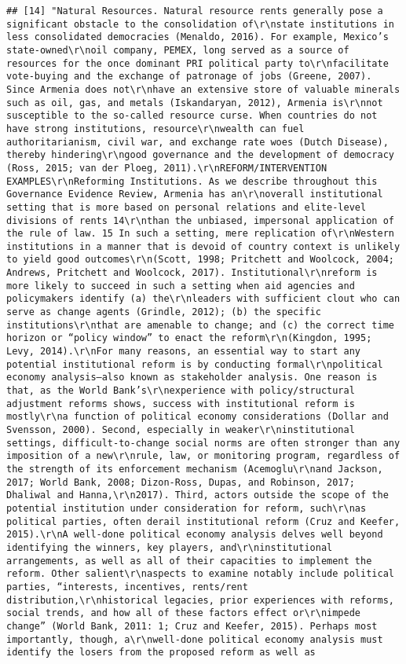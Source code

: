 \documentclass[
]{article}
\begin{document}
\begin{verbatim}
## [14] "Natural Resources. Natural resource rents generally pose a significant obstacle to the consolidation of\r\nstate institutions in less consolidated democracies (Menaldo, 2016). For example, Mexico’s state-owned\r\noil company, PEMEX, long served as a source of resources for the once dominant PRI political party to\r\nfacilitate vote-buying and the exchange of patronage of jobs (Greene, 2007). Since Armenia does not\r\nhave an extensive store of valuable minerals such as oil, gas, and metals (Iskandaryan, 2012), Armenia is\r\nnot susceptible to the so-called resource curse. When countries do not have strong institutions, resource\r\nwealth can fuel authoritarianism, civil war, and exchange rate woes (Dutch Disease), thereby hindering\r\ngood governance and the development of democracy (Ross, 2015; van der Ploeg, 2011).\r\nREFORM/INTERVENTION EXAMPLES\r\nReforming Institutions. As we describe throughout this Governance Evidence Review, Armenia has an\r\noverall institutional setting that is more based on personal relations and elite-level divisions of rents 14\r\nthan the unbiased, impersonal application of the rule of law. 15 In such a setting, mere replication of\r\nWestern institutions in a manner that is devoid of country context is unlikely to yield good outcomes\r\n(Scott, 1998; Pritchett and Woolcock, 2004; Andrews, Pritchett and Woolcock, 2017). Institutional\r\nreform is more likely to succeed in such a setting when aid agencies and policymakers identify (a) the\r\nleaders with sufficient clout who can serve as change agents (Grindle, 2012); (b) the specific institutions\r\nthat are amenable to change; and (c) the correct time horizon or “policy window” to enact the reform\r\n(Kingdon, 1995; Levy, 2014).\r\nFor many reasons, an essential way to start any potential institutional reform is by conducting formal\r\npolitical economy analysis—also known as stakeholder analysis. One reason is that, as the World Bank’s\r\nexperience with policy/structural adjustment reforms shows, success with institutional reform is mostly\r\na function of political economy considerations (Dollar and Svensson, 2000). Second, especially in weaker\r\ninstitutional settings, difficult-to-change social norms are often stronger than any imposition of a new\r\nrule, law, or monitoring program, regardless of the strength of its enforcement mechanism (Acemoglu\r\nand Jackson, 2017; World Bank, 2008; Dizon-Ross, Dupas, and Robinson, 2017; Dhaliwal and Hanna,\r\n2017). Third, actors outside the scope of the potential institution under consideration for reform, such\r\nas political parties, often derail institutional reform (Cruz and Keefer, 2015).\r\nA well-done political economy analysis delves well beyond identifying the winners, key players, and\r\ninstitutional arrangements, as well as all of their capacities to implement the reform. Other salient\r\naspects to examine notably include political parties, “interests, incentives, rents/rent distribution,\r\nhistorical legacies, prior experiences with reforms, social trends, and how all of these factors effect or\r\nimpede change” (World Bank, 2011: 1; Cruz and Keefer, 2015). Perhaps most importantly, though, a\r\nwell-done political economy analysis must identify the losers from the proposed reform as well as 
\end{verbatim}
\end{document}
